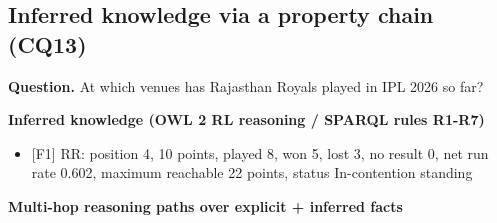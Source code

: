 \subsection{Inferred knowledge via a property chain (CQ13)}
\noindent\textbf{Question.} At which venues has Rajasthan Royals played in IPL 2026 so far?\par\smallskip
\noindent\textcolor{kginferred}{\textbf{Inferred knowledge (OWL 2 RL reasoning / SPARQL rules R1-R7)}}
\begin{itemize}\setlength\itemsep{0pt}\footnotesize
\item{} [F1] RR: position 4, 10 points, played 8, won 5, lost 3, no result 0, net run rate 0.602, maximum reachable 22 points, status In-contention standing
\end{itemize}
\noindent\textcolor{kgpath}{\textbf{Multi-hop reasoning paths over explicit + inferred facts}}
